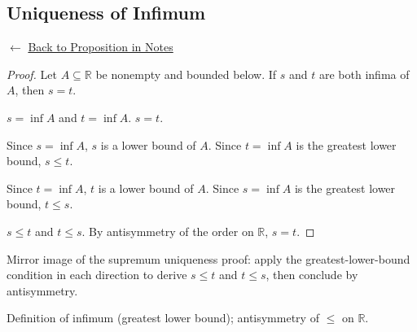 
\subsection*{Uniqueness of Infimum}
\label{prf:inf-is-unique}

\begin{remark*}[Return]
$\leftarrow$ \hyperref[prop:sup-unique]{Back to Proposition in Notes}
\end{remark*}

\begin{proof}
\Claim Let $A \subseteq \mathbb{R}$ be nonempty and bounded below.
If $s$ and $t$ are both infima of $A$, then $s = t$.

\Given $s = \inf A$ and $t = \inf A$.
\Goal $s = t$.

Since $s = \inf A$, $s$ is a lower bound of $A$.
Since $t = \inf A$ is the greatest lower bound, $s \le t$.

Since $t = \inf A$, $t$ is a lower bound of $A$.
Since $s = \inf A$ is the greatest lower bound, $t \le s$.

\Therefore $s \le t$ and $t \le s$.
By antisymmetry of the order on $\mathbb{R}$, $s = t$. \AsReq
\end{proof}

\begin{remark*}
Mirror image of the supremum uniqueness proof: apply the greatest-lower-bound
condition in each direction to derive $s \le t$ and $t \le s$, then conclude
by antisymmetry.
\end{remark*}

\begin{remark*}[Dependencies]
Definition of infimum (greatest lower bound); antisymmetry of $\le$ on $\mathbb{R}$.
\end{remark*}

